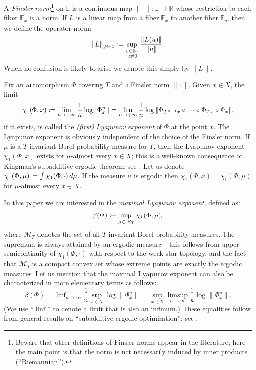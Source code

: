 \documentclass[JEP,XML,SOM,Unicode]{cedram}
\let\mathcal\mathscr
\def\vcentcolon{\mathrel{\mathop\ordinarycolon}}
\providecommand\ordinarycolon{:}
\providecommand*\coloneqq{\vcentcolon\mathrel{\mkern-1.2mu}=}
\theoremstyle{plain}
\theoremstyle{definition}
\newcommand{\RR}{\mathbb{R}}
\newcommand{\EE}{\mathbb{E}}
\newcommand{\cM}{\mathcal{M}}
\DeclareMathOperator*{\linf}{linf}
\begin{document}
A \emph{Finsler norm}\footnote{Beware that other definitions of Finsler norms appear in the literature; here the main point is that the norm is not necessarily induced by inner products (\ie ``Riemannian'').}
on $\EE$ is a continuous map $\| \mathord{\cdot} \| \colon \EE \to \RR$ whose restriction to each fiber $\EE_x$ is a norm.
If $L$ is a linear map from a fiber $\EE_x$ to another fiber $\EE_y$, then we define the operator norm:
\begin{equation}\label{e.def_operator_norm}
\|L\|_{y \gets x} \coloneqq \sup_{\substack{u \in \EE_x \\ u\neq 0}} \frac{\|L(u)\|}{\|u\|}.
\end{equation}
When no confusion is likely to arise we denote this simply by $\|L\|$.

Fix an automorphism $\Phi$ covering $T$ and a Finsler norm $\| \mathord{\cdot} \|$.
Given $x \in X$, the limit
\[
\chi_1(\Phi, x) \coloneqq \lim_{n \to +\infty} \frac{1}{n} \log \|\Phi^n_x\|
= \lim_{n \to +\infty} \frac{1}{n} \log \| \Phi_{T^{n-1}x} \circ \cdots \circ \Phi_{Tx} \circ \Phi_x\|,
\]
if it exists, is called the \emph{(first) Lyapunov exponent} of $\Phi$ at the point $x$.
The Lyapunov exponent is obviously independent of the choice of the Finsler norm.
If $\mu$ is a $T$\nobreakdash-invariant Borel probability measure for $T$, then the Lyapunov exponent $\chi_1(\Phi, x)$
exists for $\mu$-almost every $x\in X$; this is a well-known consequence of Kingman's subadditive ergodic theorem; see \eg \cite{Krengel}.
Let us denote $\chi_1(\Phi, \mu) \coloneqq \int \chi_1(\Phi,\mathord{\cdot}) \, d\mu$.
If the measure $\mu$ is ergodic then $\chi_1(\Phi, x) = \chi_1(\Phi,\mu)$ for $\mu$-almost every $x\in X$.

In this paper we are interested in the \emph{maximal Lyapunov exponent}, defined as:
\begin{equation}\label{e.def_beta}
\beta(\Phi) \coloneqq \sup_{\mu \in \cM_T} \chi_1(\Phi, \mu),
\end{equation}
where $\cM_T$ denotes the set of all $T$-invariant Borel probability measures.
The supremum is always attained by an ergodic measure -- this follows from upper semicontinuity of $\chi_1(\Phi, \mathord{\cdot})$ with respect to the weak-star topology, and the fact that $\cM_T$ is a compact convex set whose extreme points are exactly the ergodic measures.
Let us mention that the maximal Lyapunov exponent can also be characterized in more elementary terms as follows:
\begin{equation}\label{e.beta_other}
\beta(\Phi) = \linf_{n \to \infty} \frac{1}{n} \sup_{x \in X} \log \| \Phi^n_x \|
= \sup_{x \in X} \limsup_{n \to \infty} \frac{1}{n} \log \| \Phi^n_x \|.
\end{equation}
(We use ``$\linf$'' to denote a limit that is also an infimum.)
These equalities follow from general results on ``subadditive ergodic optimization'': see \cite[App.\,A]{Morris_Mather}.
\end{document}
